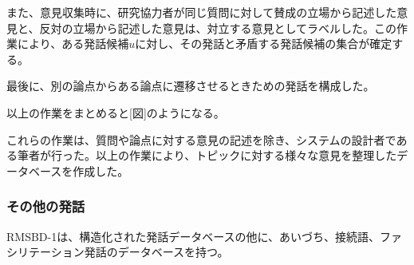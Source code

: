 \documentclass[11pt, a4paper]{jreport} %
\begin{document}
\begin{enumerate}
また、意見収集時に、研究協力者が同じ質問に対して賛成の立場から記述した意見と、反対の立場から記述した意見は、対立する意見としてラベルした。この作業により、ある発話候補$u$に対し、その発話と矛盾する発話候補の集合が確定する。


最後に、別の論点からある論点に遷移させるときための発話を構成した。


以上の作業をまとめると[図]のようになる。


これらの作業は、質問や論点に対する意見の記述を除き、システムの設計者である筆者が行った。以上の作業により、トピックに対する様々な意見を整理したデータベースを作成した。
\end{enumerate}
\subsubsection*{その他の発話}
RMSBD-1は、構造化された発話データベースの他に、あいづち、接続語、ファシリテーション発話のデータベースを持つ。
\end{document}
